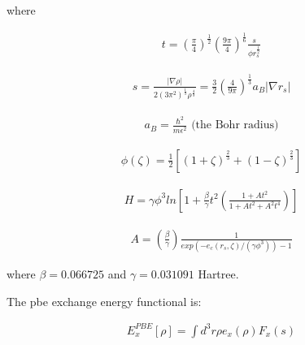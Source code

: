 where

\begin{equation}
\begin{split}
t = \left(\frac{\pi}{4}\right)^{\frac{1}{2}} \left(\frac{9 \pi}{4}\right)^{\frac{1}{6}} \frac{s}{\phi r_s^{\frac{1}{2}}}
\end{split}
\label{eq:functional9}
\end{equation}

\begin{equation}
\begin{split}
s = \frac{\lvert \nabla \rho \rvert}{2(3\pi^2)^{\frac{1}{3}} \rho^{\frac{4}{3}}} = \frac{3}{2} \left(\frac{4}{9\pi}\right)^{\frac{1}{3}} a_B \lvert \nabla r_s \rvert
\end{split}
\label{eq:functional9}
\end{equation}

\begin{equation}
\begin{split}
a_B = \frac{\hbar^2}{m \epsilon^2} \text{ (the Bohr radius)}
\end{split}
\label{eq:functional9}
\end{equation}


\begin{equation}
\begin{split}
\phi(\zeta) = \frac{1}{2} \left[(1+ \zeta)^{\frac{2}{3}} + (1 - \zeta)^{\frac{2}{3}}\right]
\end{split}
\label{eq:functional9}
\end{equation}

\begin{equation}
\begin{split}
H = \gamma \phi^3 ln \left[ 1+ \frac{\beta}{\gamma} t^2 \left(\frac{1+At^2}{1 + At^2 + A^2t^4} \right) \right]
\end{split}
\label{eq:functional9}
\end{equation}

\begin{equation}
\begin{split}
A = \left(\frac{\beta}{\gamma} \right) \frac{1}{exp(-e_c(r_s,\zeta) / (\gamma \phi^3))-1}
\end{split}
\label{eq:functional9}
\end{equation}

where $\beta = 0.066725$ and $\gamma = 0.031091$ Hartree.


The \acrshort{pbe} exchange energy functional is:

\begin{equation}
\begin{split}
E_{x}^{PBE} [\rho] = \int d^3r \rho e_x(\rho)F_x(s)
\end{split}
\label{eq:functional9}
\end{equation}

